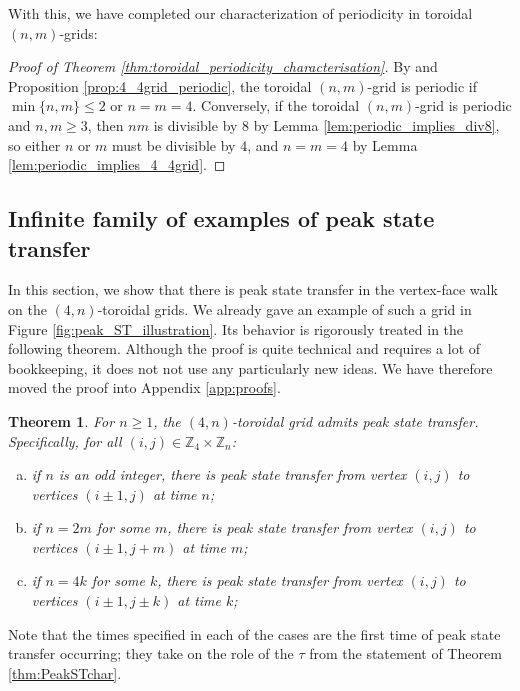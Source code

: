 \documentclass{article}
\newtheorem{theorem}{Theorem}[section]
\numberwithin{equation}{section}
\newcommand\ints{{\mathbb Z}}
\begin{document}
With this, we have completed our characterization of periodicity in toroidal $(n,m)$-grids:


\begin{proof}[Proof of Theorem \ref{thm:toroidal_periodicity_characterisation}]
By \cite{GuoSch2024} and Proposition \ref{prop:4_4grid_periodic}, the toroidal $(n,m)$-grid is periodic if $\min\{n,m\} \leq 2$ or $n = m = 4$. Conversely, if the toroidal $(n,m)$-grid is periodic and $n,m \geq 3$, then $nm$ is divisible by $8$ by Lemma \ref{lem:periodic_implies_div8}, so either $n$ or $m$ must be divisible by $4$, and $n = m = 4$ by Lemma \ref{lem:periodic_implies_4_4grid}.
\end{proof}


\subsection{Infinite family of examples of peak state transfer}
\label{subsec:peakST_grids_inf_fam}

In this section, we show that there is peak state transfer in the vertex-face walk on the $(4,n)$-toroidal grids. We already gave an example of such a grid in Figure \ref{fig:peak_ST_illustration}. Its behavior is rigorously treated in the following theorem. Although the proof is quite technical and requires a lot of bookkeeping, it does not not use any particularly new ideas. We have therefore moved the proof into Appendix \ref{app:proofs}.

\begin{theorem}
    \label{thm:4n_grids_peakST}
    For $n \geq 1$, the $(4,n)$-toroidal grid admits peak state transfer. Specifically, for all $(i,j) \in \ints_{4} \times \ints_n$:
    \begin{enumerate}[(a)]
        \item if $n$ is an odd integer, there is peak state transfer from vertex $(i,j)$ to vertices $(i\pm 1,j)$ at time $n$;
        \item if $n = 2m$ for some $m$, there is peak state transfer from vertex $(i,j)$ to vertices $(i\pm 1,j + m)$ at time $m$;
        \item if $n = 4k$ for some $k$, there is peak state transfer from vertex $(i,j)$ to vertices $(i\pm 1,j \pm k)$ at time $k$; 
    \end{enumerate}
\end{theorem}
Note that the times specified in each of the cases are the first time of peak state transfer occurring; they take on the role of the $\tau$ from the statement of Theorem \ref{thm:PeakSTchar}.
\end{document}

